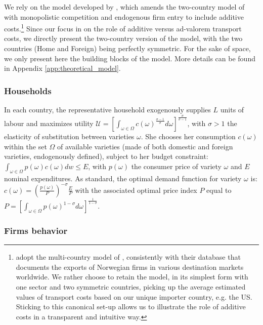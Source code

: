 \documentclass[a4paper,11pt]{article}
\begin{document}
We rely on the model developed by \cite{sorensen2014}, which amends the two-country model of \cite{melitz} with monopolistic competition and endogenous firm entry to include additive costs.\footnote{\cite{Irrazabal_2015} adopt the multi-country model of \cite{chaney2008}, consistently with their database that documents the exports of Norwegian firms in various destination markets worldwide. We rather choose to retain the \cite{melitz} model, in its simplest form with one sector and two symmetric countries, picking up the average estimated values of transport costs based on our unique importer country, e.g. the US. Sticking to this canonical set-up allows us to illustrate the role of additive costs in a transparent and intuitive way.} Since our focus in on the role of additive versus ad-valorem transport costs, we directly present the two-country version of the model, with the two countries (Home and Foreign) being perfectly symmetric. For the sake of space, we only present here the building blocks of the model. More details can be found in Appendix \ref{app:theoretical_model}.

\subsubsection{Households}

In each country, the representative household exogenously supplies $L$ units of labour and maximizes utility $\mathcal{U} = \left[ \int_{\omega \in \Omega}c(\omega)^{\frac{\sigma-1}{\sigma}} d\omega \right]^{\frac{\sigma}{\sigma-1}}$, with $\sigma>1$ the elasticity of substitution between varieties $\omega$. She chooses her consumption $c(\omega)$  within the set $\Omega$ of available varieties (made of both domestic and foreign varieties, endogenously defined), subject to her budget constraint: $\int_{\omega \in \Omega} p(\omega) c(\omega) dw \leq E$, with $p(\omega)$ the consumer price of variety $\omega$ and $E$ nominal expenditures. As standard, the optimal demand function for variety $\omega$ is: $c(\omega) = \left(\frac{p(\omega)}{P}  \right)^{-\sigma} \frac{E}{P}$ with the associated optimal price index $P$ equal to $P = \left[ \int_{\omega \in \Omega}p(\omega)^{1-\sigma}d\omega\right]^{\frac{1}{1-\sigma}} $.


\subsubsection{Firms behavior}
\end{document}
